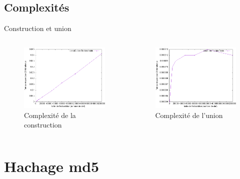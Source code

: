 \documentclass[11pt]{beamer}
\begin{document}
\subsection{Complexités}


\begin{frame}{Construction et union}

\begin{columns}[t]
  \begin{column}{5cm}
  
\begin{figure}[hbtp]
\centering
\includegraphics[width=5cm]{../Images/svg courbes pour rapport/cplxt_binomiale.png}
\caption{Complexité de la construction}
\label{fig1}
\end{figure}


  \end{column}
  
  \begin{column}{5cm}
  
\begin{figure}[hbtp]
\centering
\includegraphics[width=5cm]{../Images/svg courbes pour rapport/cplxt_union_file.png}
\caption{Complexité de l'union}
\label{fig2}
\end{figure}
  
  
  \end{column}
 \end{columns}  



\end{frame}






\section{Hachage md5}
\end{document}
